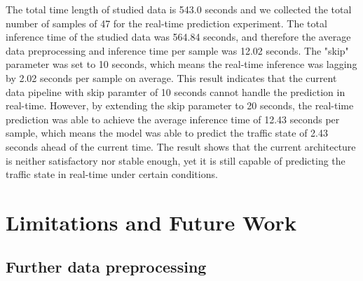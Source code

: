 \documentclass[11pt]{uonthesis}
\begin{document}
The total time length of studied data is 543.0 seconds and we collected the total number of samples of 47 for the real-time prediction experiment. The total inference time of the studied data was 564.84 seconds, and therefore the average data preprocessing and inference time per sample was 12.02 seconds. The "skip" parameter was set to 10 seconds, which means the real-time inference was lagging by 2.02 seconds per sample on average. This result indicates that the current data pipeline with skip paramter of 10 seconds cannot handle the prediction in real-time. However, by extending the skip parameter to 20 seconds, the real-time prediction was able to achieve the average inference time of 12.43 seconds per sample, which means the model was able to predict the traffic state of 2.43 seconds ahead of the current time. The result shows that the current architecture is neither satisfactory nor stable enough, yet it is still capable of predicting the traffic state in real-time under certain conditions. %

\chapter{Limitations and Future Work}

\section{Further data preprocessing}
\end{document}
